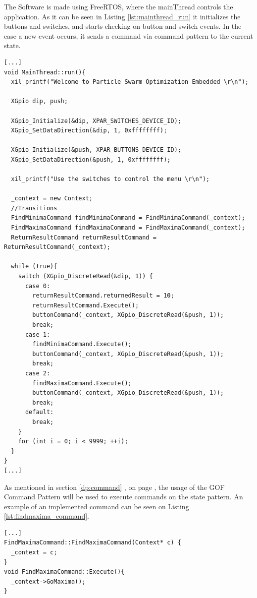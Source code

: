 The Software is made using FreeRTOS, where the mainThread controls the application. As it can be seen in Listing \ref{lst:mainthread_run} it initializes the buttons and switches, and starts checking on button and switch events. In the case a new event occurs, it sends a command via command pattern to the current state.

\begin{lstlisting}[style=customc++, label={lst:mainthread_run}, caption={MainThread run thread.}]
[...]
void MainThread::run(){
  xil_printf("Welcome to Particle Swarm Optimization Embedded \r\n");

  XGpio dip, push;

  XGpio_Initialize(&dip, XPAR_SWITCHES_DEVICE_ID);
  XGpio_SetDataDirection(&dip, 1, 0xffffffff);

  XGpio_Initialize(&push, XPAR_BUTTONS_DEVICE_ID);
  XGpio_SetDataDirection(&push, 1, 0xffffffff);

  xil_printf("Use the switches to control the menu \r\n");

  _context = new Context;
  //Transitions
  FindMinimaCommand findMinimaCommand = FindMinimaCommand(_context);
  FindMaximaCommand findMaximaCommand = FindMaximaCommand(_context);
  ReturnResultCommand returnResultCommand = ReturnResultCommand(_context);

  while (true){
    switch (XGpio_DiscreteRead(&dip, 1)) {
      case 0:
        returnResultCommand.returnedResult = 10;
        returnResultCommand.Execute();
        buttonCommand(_context, XGpio_DiscreteRead(&push, 1));
        break;
      case 1:
        findMinimaCommand.Execute();
        buttonCommand(_context, XGpio_DiscreteRead(&push, 1));
        break;
      case 2:
        findMaximaCommand.Execute();
        buttonCommand(_context, XGpio_DiscreteRead(&push, 1));
        break;
      default:
        break;
    }
    for (int i = 0; i < 9999; ++i);
  }
}
[...]
\end{lstlisting}

As mentioned in section \ref{dp:command} , on page \pageref{dp:command}, the usage of the GOF Command Pattern will be used to execute commands on the state pattern. An example of an implemented command can be seen on Listing \ref{lst:findmaxima_command}.

\begin{lstlisting}[style=customc++, label={lst:findmaxima_command}, caption={FindMaxima command implementation.}]
[...]
FindMaximaCommand::FindMaximaCommand(Context* c) {
  _context = c;
}
void FindMaximaCommand::Execute(){
  _context->GoMaxima();
}
\end{lstlisting}

